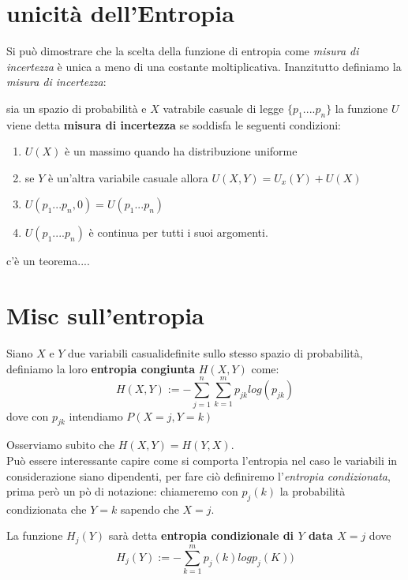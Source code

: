 \section{unicità dell'Entropia}
\label{sec:UniEntropia}
Si può dimostrare che la scelta della funzione di entropia come \textit{misura di incertezza} è unica a meno di una costante moltiplicativa. Inanzitutto definiamo la \textit{misura di incertezza}:
\begin{defi}
sia \spacep un spazio di probabilità e $X$ vatrabile casuale di legge $\{ p_1....p_n \}$ 
la funzione $U$ viene detta \textbf{misura di incertezza} se soddisfa le seguenti condizioni:
\begin{enumerate}
\item $U(X)$ è un massimo quando ha distribuzione uniforme
\item se $Y$ è un'altra variabile casuale allora $U(X,Y)=U_x(Y)+U(X)$
\item $U(p_1...p_n,0)=U(p_1...p_n)$
\item $U(p_1....p_n)$ è continua per tutti i suoi argomenti.
\end{enumerate}
\end{defi}
c'è un teorema....
\section{Misc sull'entropia}
\label{sec:miscEntropia}


\begin{defi}
Siano $X$ e $Y$ due variabili casualidefinite sullo stesso spazio di probabilità, definiamo la loro \textbf{entropia congiunta} $H(X,Y)$ come:
\begin{equation}
H(X,Y):=-\sum_{j=1}^n\sum_{k=1}^m p_{jk}log(p_{jk})
\end{equation}
dove con $p_{jk}$ intendiamo $P(X=j,Y=k)$
\end{defi}

Osserviamo subito che $H(X,Y)=H(Y,X)$.\\
Può essere interessante capire come si comporta l'entropia nel caso le variabili in considerazione siano dipendenti, per fare ciò definiremo l'\textit{entropia condizionata}, prima però un pò di notazione: chiameremo con $p_{j}(k)$ la probabilità condizionata che $Y=k$ sapendo che $X=j$.
\begin{defi}
La funzione $H_j(Y)$ sarà detta \textbf{entropia condizionale di $Y$ data $X=j$} dove
\begin{equation}\label{eq:6.6}
H_j(Y):=-\sum_{k=1}^m p_j(k)logp_j(K))
\end{equation}
\end{defi}

